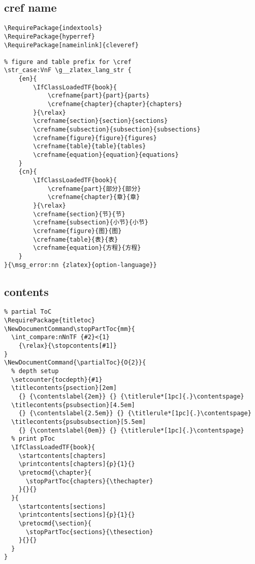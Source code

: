 \subsection{cref name}
\begin{verbatim}
\RequirePackage{indextools}
\RequirePackage{hyperref}
\RequirePackage[nameinlink]{cleveref}

% figure and table prefix for \cref 
\str_case:VnF \g__zlatex_lang_str {
    {en}{
        \IfClassLoadedTF{book}{
            \crefname{part}{part}{parts}
            \crefname{chapter}{chapter}{chapters}
        }{\relax}
        \crefname{section}{section}{sections}
        \crefname{subsection}{subsection}{subsections}
        \crefname{figure}{figure}{figures}
        \crefname{table}{table}{tables}
        \crefname{equation}{equation}{equations}
    }
    {cn}{
        \IfClassLoadedTF{book}{
            \crefname{part}{部分}{部分}
            \crefname{chapter}{章}{章}
        }{\relax}
        \crefname{section}{节}{节}
        \crefname{subsection}{小节}{小节}
        \crefname{figure}{图}{图}
        \crefname{table}{表}{表}
        \crefname{equation}{方程}{方程}
    }
}{\msg_error:nn {zlatex}{option-language}}    
\end{verbatim}

\subsection{contents}
\begin{verbatim}
% partial ToC
\RequirePackage{titletoc}
\NewDocumentCommand\stopPartToc{mm}{
  \int_compare:nNnTF {#2}<{1}
    {\relax}{\stopcontents[#1]}
}
\NewDocumentCommand{\partialToc}{O{2}}{
  % depth setup
  \setcounter{tocdepth}{#1} 
  \titlecontents{psection}[2em]
    {} {\contentslabel{2em}} {} {\titlerule*[1pc]{.}\contentspage}
  \titlecontents{psubsection}[4.5em]
    {} {\contentslabel{2.5em}} {} {\titlerule*[1pc]{.}\contentspage}
  \titlecontents{psubsubsection}[5.5em]
    {} {\contentslabel{0em}} {} {\titlerule*[1pc]{.}\contentspage}
  % print pToc
  \IfClassLoadedTF{book}{ 
    \startcontents[chapters]
    \printcontents[chapters]{p}{1}{}
    \pretocmd{\chapter}{
      \stopPartToc{chapters}{\thechapter}
    }{}{}
  }{
    \startcontents[sections]
    \printcontents[sections]{p}{1}{}
    \pretocmd{\section}{
      \stopPartToc{sections}{\thesection}
    }{}{}
  }
}
\end{verbatim}

